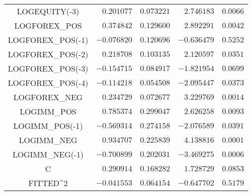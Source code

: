 \begin{tabular}{lrrrr}
\multicolumn{1}{c}{LOGEQUITY(-3)}&\multicolumn{1}{r}{$0.201077$}&\multicolumn{1}{r}{$0.073221$}&\multicolumn{1}{r}{$2.746183$}&\multicolumn{1}{r}{$0.0066$}\\
\multicolumn{1}{c}{LOGFOREX\_POS}&\multicolumn{1}{r}{$0.374842$}&\multicolumn{1}{r}{$0.129600$}&\multicolumn{1}{r}{$2.892291$}&\multicolumn{1}{r}{$0.0042$}\\
\multicolumn{1}{c}{LOGFOREX\_POS(-1)}&\multicolumn{1}{r}{$-0.076820$}&\multicolumn{1}{r}{$0.120696$}&\multicolumn{1}{r}{$-0.636479$}&\multicolumn{1}{r}{$0.5252$}\\
\multicolumn{1}{c}{LOGFOREX\_POS(-2)}&\multicolumn{1}{r}{$0.218708$}&\multicolumn{1}{r}{$0.103135$}&\multicolumn{1}{r}{$2.120597$}&\multicolumn{1}{r}{$0.0351$}\\
\multicolumn{1}{c}{LOGFOREX\_POS(-3)}&\multicolumn{1}{r}{$-0.154715$}&\multicolumn{1}{r}{$0.084917$}&\multicolumn{1}{r}{$-1.821954$}&\multicolumn{1}{r}{$0.0699$}\\
\multicolumn{1}{c}{LOGFOREX\_POS(-4)}&\multicolumn{1}{r}{$-0.114218$}&\multicolumn{1}{r}{$0.054508$}&\multicolumn{1}{r}{$-2.095447$}&\multicolumn{1}{r}{$0.0373$}\\
\multicolumn{1}{c}{LOGFOREX\_NEG}&\multicolumn{1}{r}{$0.234729$}&\multicolumn{1}{r}{$0.072677$}&\multicolumn{1}{r}{$3.229769$}&\multicolumn{1}{r}{$0.0014$}\\
\multicolumn{1}{c}{LOGIMM\_POS}&\multicolumn{1}{r}{$0.785374$}&\multicolumn{1}{r}{$0.299047$}&\multicolumn{1}{r}{$2.626258$}&\multicolumn{1}{r}{$0.0093$}\\
\multicolumn{1}{c}{LOGIMM\_POS(-1)}&\multicolumn{1}{r}{$-0.569314$}&\multicolumn{1}{r}{$0.274158$}&\multicolumn{1}{r}{$-2.076589$}&\multicolumn{1}{r}{$0.0391$}\\
\multicolumn{1}{c}{LOGIMM\_NEG}&\multicolumn{1}{r}{$0.934707$}&\multicolumn{1}{r}{$0.225839$}&\multicolumn{1}{r}{$4.138816$}&\multicolumn{1}{r}{$0.0001$}\\
\multicolumn{1}{c}{LOGIMM\_NEG(-1)}&\multicolumn{1}{r}{$-0.700899$}&\multicolumn{1}{r}{$0.202031$}&\multicolumn{1}{r}{$-3.469275$}&\multicolumn{1}{r}{$0.0006$}\\
\multicolumn{1}{c}{C}&\multicolumn{1}{r}{$0.290914$}&\multicolumn{1}{r}{$0.168282$}&\multicolumn{1}{r}{$1.728729$}&\multicolumn{1}{r}{$0.0853$}\\
\multicolumn{1}{c}{FITTED\textasciicircum 2}&\multicolumn{1}{r}{$-0.041553$}&\multicolumn{1}{r}{$0.064154$}&\multicolumn{1}{r}{$-0.647702$}&\multicolumn{1}{r}{$0.5179$}\\

\end{tabular}
